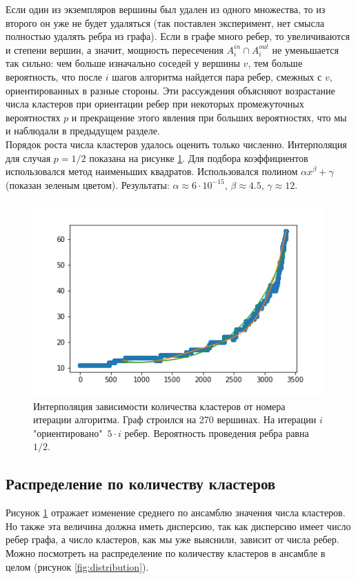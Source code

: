 Если один из экземпляров вершины был удален из одного множества, то из второго он уже не будет удаляться (так поставлен эксперимент, нет смысла полностью удалять ребра из графа). Если в графе много ребер, то увеличиваются и степени вершин, а значит, мощность пересечения $A_i^{in}\cap A_i^{out}$ не уменьшается так сильно: чем больше изначально соседей у вершины $v$, тем больше вероятность, что после $i$ шагов алгоритма найдется пара ребер, смежных с $v$, ориентированных в разные стороны. Эти рассуждения объясняют возрастание числа кластеров при ориентации ребер при некоторых промежуточных вероятностях $p$ и прекращение этого явления при больших вероятностях, что мы и наблюдали в предыдущем разделе.\\

Порядок роста числа кластеров удалось оценить только численно. Интерполяция для случая $p=1/2$ показана на рисунке \ref{fig:interpolation}. Для подбора коэффициентов использовался метод наименьших квадратов. Использовался полином $\alpha x^{\beta}+\gamma$ (показан зеленым цветом). Результаты: $\alpha \approx 6\cdot 10^{-15}$, $\beta \approx 4.5$, $\gamma \approx 12$. 

\begin{figure}[h!]
	\centering
	\includegraphics[width=\textwidth]{pics/interpolation.png}
	\caption{Интерполяция зависимости количества кластеров от номера итерации алгоритма. Граф строился на 270 вершинах. На итерации $i$ "ориентировано"\ $5\cdot i$ ребер. Вероятность проведения ребра равна $1/2$.}
	\label{fig:interpolation}
\end{figure}

\subsection{Распределение по количеству кластеров}
Рисунок \ref{fig:interpolation} отражает изменение среднего по ансамблю значения числа кластеров. Но также эта величина должна иметь дисперсию, так как дисперсию имеет число ребер графа, а число кластеров, как мы уже выяснили, зависит от числа ребер. Можно посмотреть на распределение по количеству кластеров в ансамбле в целом (рисунок \ref{fig:distribution}).

